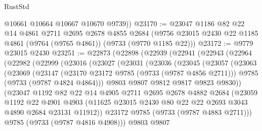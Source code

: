 \begin{lexlean}{RustStd}
\begin{coremodule}
{\begin{coremodule}
{{{{{{{{{{{{{{{{{{{{{{{{{{{{{{{{{{{{{{{{{{{{{{{{{{{{{{{        @10661
        @10664
        @10667
        @10670
        @9739))
@23170 := @23047
    @1186
    @82
    @22
    @14
    @4861
    @2711
    @2695
    @2678
    @4855
    @2684
    (@9756 @23015 @2430 @22 @1185 @4861 (@9764 (@9765 @4861)) (@9733 (@9770 @1185 @22)))
@23172 := @9779 @23015 @2430
@23251 := @22873
    (@22898
      (@22939
        (@22941
          (@22943
            (@22964
              (@22982
                (@22999
                  (@23016
                    (@23027
                      (@23031
                        (@23036
                          (@23045
                            (@23057
                              (@23063
                                (@23069
                                  (@23147
                                    (@23170 @23172 @9785 (@9733 (@9787 @4856 @2711)))
                                    @9785
                                    (@9733 (@9787 @4824 @4864)))
                                  @9803
                                  @9807
                                  @9812
                                  @9817
                                  @9823
                                  @9830))
                              (@23047
                                @1192
                                @82
                                @22
                                @14
                                @4905
                                @2711
                                @2695
                                @2678
                                @4882
                                @2684
                                (@23059
                                  @1192
                                  @22
                                  @4901
                                  @4903
                                  (@11625
                                    @23015
                                    @2430
                                    @80
                                    @22
                                    @22
                                    @2693
                                    @3043
                                    @4890
                                    @2684
                                    @23131
                                    @11912))
                                @23172
                                @9785
                                (@9733 (@9787 @4883 @2711)))
                              @9785
                              (@9733 (@9787 @4816 @4908)))
                            @9803
                            @9807
}}}}}}}}}}}}}}}}}}}}}}}}}}}}}}}}}}}}}}}}}}}}}}}}}}}}}}}
\end{coremodule}}
\end{coremodule}
\end{lexlean}
